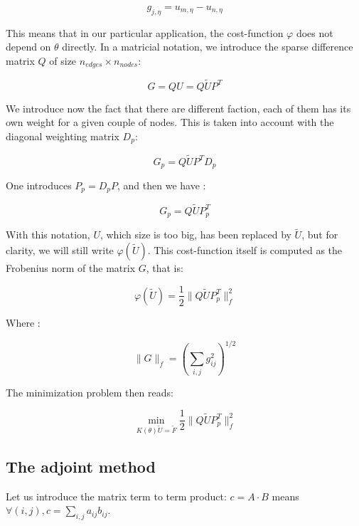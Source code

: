 \documentclass[11pt,a4paper]{article}		%
\begin{document}
\begin{equation}
g_{j,\eta} = u_{m,\eta}-u_{n,\eta}
\end{equation}

This means that in our particular application, the cost-function $\varphi$ does not depend on $\theta$ directly. In a matricial notation, we introduce the sparse difference matrix $Q$ of size $n_{edges}\times n_{nodes}$:

\begin{equation}
G = QU = Q\tilde{U}P^T
\end{equation}

We introduce now the fact that there are different faction, each of them has its own weight for a given couple of nodes. This is taken into account with the diagonal weighting matrix $D_p$:

\begin{equation}
G_p = Q\tilde{U}P^TD_p
\end{equation}

One introduces $P_p = D_pP$, and then we have :

\begin{equation}
G_p = Q\tilde{U}P_p^T
\end{equation}

With this notation, $U$, which size is too big, has been replaced by $\tilde{U}$, but for clarity, we will still write $\varphi(\tilde{U})$. This cost-function itself is computed as the Frobenius norm of the matrix $G$, that is:

\begin{equation}\label{eqn:phi}
\varphi(\tilde{U}) = \dfrac{1}{2} \|Q\tilde{U}P_p^T\|_f^2
\end{equation}

Where :

\begin{equation}
\|G\|_f = \left(\sum_{i,j}g_{ij}^2\right)^{1/2}
\end{equation}

The minimization problem then reads:

\begin{equation}
\min_{K(\theta)\tilde{U} = \tilde{F}} \dfrac{1}{2} \|Q\tilde{U}P_p^T\|_f^2
\end{equation}

\subsection{The adjoint method}

Let us introduce the matrix term to term product: $c = A\cdot B$ means $\forall (i,j), c = \sum_{i,j} a_{ij} b_{ij}$.
\end{document}
